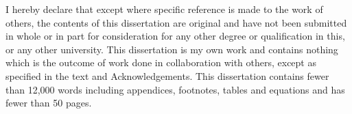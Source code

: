 
\begin{declaration}

I hereby declare that except where specific reference is made to the work of 
others, the contents of this dissertation are original and have not been 
submitted in whole or in part for consideration for any other degree or 
qualification in this, or any other university. This dissertation is my own 
work and contains nothing which is the outcome of work done in collaboration 
with others, except as specified in the text and Acknowledgements. This 
dissertation contains fewer than 12,000 words including appendices, footnotes, tables and equations and has fewer than 50 pages.


\end{declaration}

